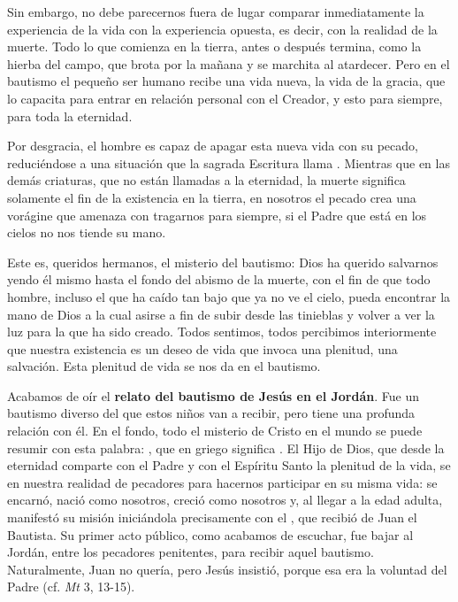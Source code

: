 \begin{body}
\begin{body}
{Sin embargo, no debe parecernos fuera de lugar comparar inmediatamente la experiencia de la vida con la experiencia opuesta, es decir, con la realidad de la muerte. Todo lo que comienza en la tierra, antes o después termina, como la hierba del campo, que brota por la mañana y se marchita al atardecer. Pero en el bautismo el pequeño ser humano recibe una vida nueva, la vida de la gracia, que lo capacita para entrar en relación personal con el Creador, y esto para siempre, para toda la eternidad.

Por desgracia, el hombre es capaz de apagar esta nueva vida con su pecado, reduciéndose a una situación que la sagrada Escritura llama . Mientras que en las demás criaturas, que no están llamadas a la eternidad, la muerte significa solamente el fin de la existencia en la tierra, en nosotros el pecado crea una vorágine que amenaza con tragarnos para siempre, si el Padre que está en los cielos no nos tiende su mano.

Este es, queridos hermanos, el misterio del bautismo: Dios ha querido salvarnos yendo él mismo hasta el fondo del abismo de la muerte, con el fin de que todo hombre, incluso el que ha caído tan bajo que ya no ve el cielo, pueda encontrar la mano de Dios a la cual asirse a fin de subir desde las tinieblas y volver a ver la luz para la que ha sido creado. Todos sentimos, todos percibimos interiormente que nuestra existencia es un deseo de vida que invoca una plenitud, una salvación. Esta plenitud de vida se nos da en el bautismo.

Acabamos de oír el \textbf{relato del bautismo de Jesús en el Jordán}. Fue un bautismo diverso del que estos niños van a recibir, pero tiene una profunda relación con él. En el fondo, todo el misterio de Cristo en el mundo se puede resumir con esta palabra: , que en griego significa . El Hijo de Dios, que desde la eternidad comparte con el Padre y con el Espíritu Santo la plenitud de la vida, se  en nuestra realidad de pecadores para hacernos participar en su misma vida: se encarnó, nació como nosotros, creció como nosotros y, al llegar a la edad adulta, manifestó su misión iniciándola precisamente con el , que recibió de Juan el Bautista. Su primer acto público, como acabamos de escuchar, fue bajar al Jordán, entre los pecadores penitentes, para recibir aquel bautismo. Naturalmente, Juan no quería, pero Jesús insistió, porque esa era la voluntad del Padre (cf. \emph{Mt} 3, 13-15).

}
\end{body}
\end{body}
